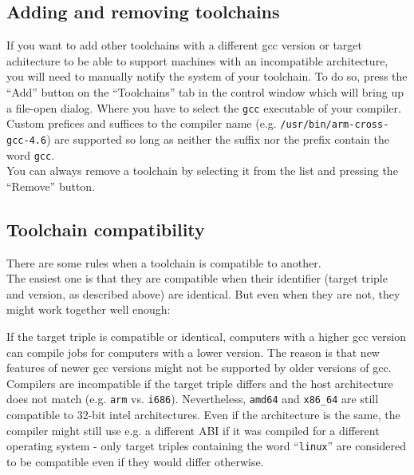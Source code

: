 \documentclass[a4paper,9pt]{scrartcl}
\begin{document}
\subsection{Adding and removing toolchains}

If you want to add other toolchains with a different gcc version or target achitecture to be able to support machines with an incompatible architecture, you will need to manually notify the system of your toolchain. To do so, press the ``Add'' button on the ``Toolchains'' tab in the control window which will bring up a file-open dialog. Where you have to select the \texttt{gcc} executable of your compiler. Custom prefices and suffices to the compiler name (e.g. \texttt{/usr/bin/arm-cross-gcc-4.6}) are supported so long as neither the suffix nor the prefix contain the word \texttt{gcc}. \\You can always remove a toolchain by selecting it from the list and pressing the ``Remove'' button.

\subsection{Toolchain compatibility}

There are some rules when a toolchain is compatible to another.\\
The easiest one is that they are compatible when their identifier (target triple and version, as described above) are identical. But even when they are not, they might work together well enough:\\
\smallskip

If the target triple is compatible or identical, computers with a higher gcc version can compile jobs for computers with a lower version. The reason is that new features of newer gcc versions might not be supported by older versions of gcc.\\
\smallskip
Compilers are incompatible if the target triple differs and the host architecture does not match (e.g. \texttt{arm} vs. \texttt{i686}). Nevertheless, \texttt{amd64} and \texttt{x86\_64} are still compatible to 32-bit intel architectures. Even if the architecture is the same, the compiler might still use e.g. a different ABI if it was compiled for a different operating system - only target triples containing the word ``\texttt{linux}'' are considered to be compatible even if they would differ otherwise.
\end{document}
